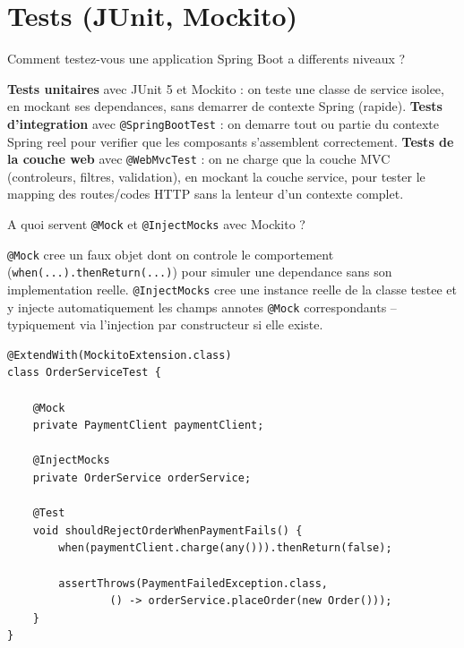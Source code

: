 \documentclass[11pt,a4paper]{article}
\begin{document}
\section{Tests (JUnit, Mockito)}

\begin{question} Comment testez-vous une application Spring Boot a differents niveaux ?
\end{question}
\begin{reponse}
\textbf{Tests unitaires} avec JUnit 5 et Mockito : on teste une classe de service isolee, en mockant ses dependances, sans demarrer de contexte Spring (rapide). \textbf{Tests d'integration} avec \texttt{@SpringBootTest} : on demarre tout ou partie du contexte Spring reel pour verifier que les composants s'assemblent correctement. \textbf{Tests de la couche web} avec \texttt{@WebMvcTest} : on ne charge que la couche MVC (controleurs, filtres, validation), en mockant la couche service, pour tester le mapping des routes/codes HTTP sans la lenteur d'un contexte complet.
\end{reponse}

\begin{question} A quoi servent \texttt{@Mock} et \texttt{@InjectMocks} avec Mockito ?
\end{question}
\begin{reponse}
\texttt{@Mock} cree un faux objet dont on controle le comportement (\texttt{when(...).thenReturn(...)}) pour simuler une dependance sans son implementation reelle. \texttt{@InjectMocks} cree une instance reelle de la classe testee et y injecte automatiquement les champs annotes \texttt{@Mock} correspondants -- typiquement via l'injection par constructeur si elle existe.
\end{reponse}

\begin{lstlisting}
@ExtendWith(MockitoExtension.class)
class OrderServiceTest {

    @Mock
    private PaymentClient paymentClient;

    @InjectMocks
    private OrderService orderService;

    @Test
    void shouldRejectOrderWhenPaymentFails() {
        when(paymentClient.charge(any())).thenReturn(false);

        assertThrows(PaymentFailedException.class,
                () -> orderService.placeOrder(new Order()));
    }
}
\end{lstlisting}
\end{document}

